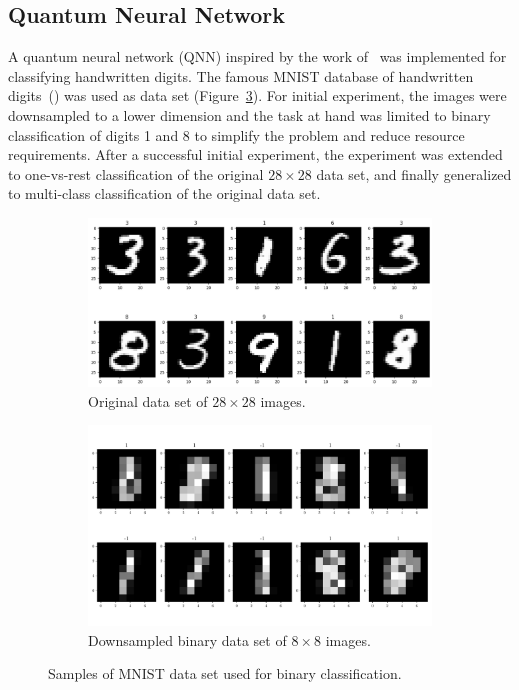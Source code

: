\documentclass[a4paper,10pt]{article}
\begin{document}
\subsection{Quantum Neural Network}
A quantum neural network (QNN) inspired by the work of~\cite{qnn-near-term} was implemented for classifying handwritten digits.
The famous MNIST database of handwritten digits~(\cite{mnist-digits}) was used as data set (Figure~\ref{fig:mnist}).
For initial experiment, the images were downsampled to a lower dimension and the task at hand was limited to binary classification of digits 1 and 8 to simplify the problem and reduce resource requirements.
After a successful initial experiment, the experiment was extended to one-vs-rest classification of the original $28 \times 28$ data set, and finally generalized to multi-class classification of the original data set.
\begin{figure}[ht]
	\centering
	\begin{subfigure}{.5\textwidth}
		\centering
		\includegraphics[width=.925\linewidth]{figures/mnist_28x28.png}
		\caption{Original data set of $28 \times 28$ images.}
		\label{fig:mnist_28x28}
	\end{subfigure}%
	\begin{subfigure}{.5\textwidth}
		\centering
		\includegraphics[width=.925\linewidth]{figures/mnist_8x8}
		\caption{Downsampled binary data set of $8 \times 8$ images.}
		\label{fig:mnist_8x8}
	\end{subfigure}
	\caption{Samples of MNIST data set used for binary classification.}
	\label{fig:mnist}
\end{figure}
\end{document}
